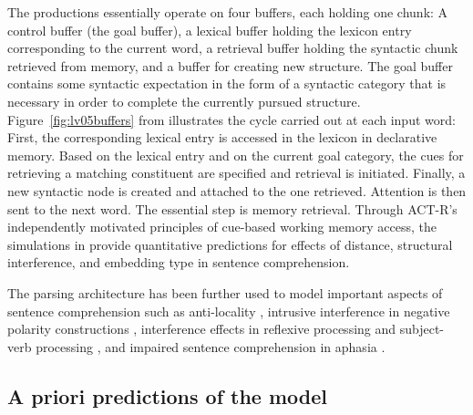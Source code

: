 \documentclass{cambridge7A}\usepackage[]{graphicx}\usepackage[]{color}
\begin{document}
%
The productions essentially operate on four buffers, each holding one chunk: A control buffer (the goal buffer), a lexical buffer holding the lexicon entry corresponding to the current word, a retrieval buffer holding the syntactic chunk retrieved from memory, and a buffer for creating new structure.
The goal buffer contains some syntactic expectation in the form of a syntactic category that is necessary in order to complete the currently pursued structure.
Figure~\ref{fig:lv05buffers} from \cite{LewisVasishth2005} illustrates the cycle carried out at each input word: First, the corresponding lexical entry is accessed in the lexicon in declarative memory. Based on the lexical entry and on the current goal category, the cues for retrieving a matching constituent are specified and retrieval is initiated. Finally, a new syntactic node is created and attached to the one retrieved. Attention is then sent to the next word. The essential step is memory retrieval. Through ACT-R's independently motivated principles of cue-based working memory access, the simulations in \cite{LewisVasishth2005} provide quantitative predictions for effects of distance, structural interference, and embedding type in sentence comprehension.


The parsing architecture has been further used to model important aspects of sentence comprehension such as anti-locality \citep{VasishthLewis2006}, intrusive interference in negative polarity constructions \citep{VasishthBruessowLewis2008}, interference effects in reflexive processing \citep{PatilVasishthLewis2012,ParkerPhillips2014,JaegerEngelmannVasishth2015} and subject-verb processing
\citep{WagersLauPhillips2009,DillonMishlerSloggett2013}, and impaired sentence comprehension in aphasia \citep{PatilEtAl2016,MaetzigEtAltopics2018}.

\subsection{A priori predictions of the model} \label{lv05predictions}
\end{document}
